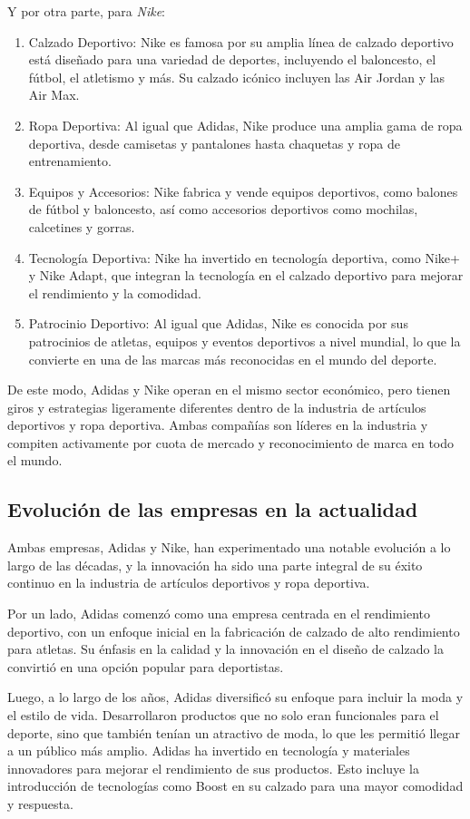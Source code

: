 \documentclass[a4paper,12pt]{article}
\begin{document}
Y por otra parte, para \emph{Nike}:
\begin{enumerate}
	\item Calzado Deportivo: Nike es famosa por su amplia línea de calzado deportivo está diseñado para una variedad de deportes, incluyendo el baloncesto, el fútbol, el atletismo y más. Su calzado icónico incluyen las Air Jordan y las Air Max.

	\item Ropa Deportiva: Al igual que Adidas, Nike produce una amplia gama de ropa deportiva, desde camisetas y pantalones hasta chaquetas y ropa de entrenamiento.

	\item Equipos y Accesorios: Nike fabrica y vende equipos deportivos, como balones de fútbol y baloncesto, así como accesorios deportivos como mochilas, calcetines y gorras.

	\item Tecnología Deportiva: Nike ha invertido en tecnología deportiva, como Nike+ y Nike Adapt, que integran la tecnología en el calzado deportivo para mejorar el rendimiento y la comodidad.

	\item Patrocinio Deportivo: Al igual que Adidas, Nike es conocida por sus patrocinios de atletas, equipos y eventos deportivos a nivel mundial, lo que la convierte en una de las marcas más reconocidas en el mundo del deporte.
\end{enumerate}

De este modo, Adidas y Nike operan en el mismo sector económico, pero tienen giros y estrategias ligeramente diferentes dentro de la industria de artículos deportivos y ropa deportiva. Ambas compañías son líderes en la industria y compiten activamente por cuota de mercado y reconocimiento de marca en todo el mundo.\par

\subsection{Evolución de las empresas en la actualidad}

Ambas empresas, Adidas y Nike, han experimentado una notable evolución a lo largo de las décadas, y la innovación ha sido una parte integral de su éxito continuo en la industria de artículos deportivos y ropa deportiva.

Por un lado, Adidas comenzó como una empresa centrada en el rendimiento deportivo, con un enfoque inicial en la fabricación de calzado de alto rendimiento para atletas. Su énfasis en la calidad y la innovación en el diseño de calzado la convirtió en una opción popular para deportistas. \par
Luego, a lo largo de los años, Adidas diversificó su enfoque para incluir la moda y el estilo de vida. Desarrollaron productos que no solo eran funcionales para el deporte, sino que también tenían un atractivo de moda, lo que les permitió llegar a un público más amplio. Adidas ha invertido en tecnología y materiales innovadores para mejorar el rendimiento de sus productos. Esto incluye la introducción de tecnologías como Boost en su calzado para una mayor comodidad y respuesta. \par
\end{document}
